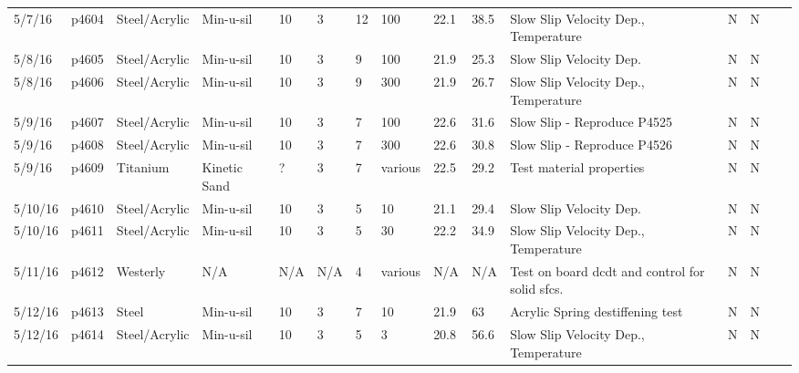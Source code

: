 \begin{landscape}
\begin{longtable}{lllllllllllllll}
5/7/16   & p4604      & Steel/Acrylic    & Min-u-sil    & 10           & 3         & 12            & 100                          & 22.1        & 38.5     & Slow Slip Velocity Dep., Temperature            & N     & N    &  &  \\
5/8/16   & p4605      & Steel/Acrylic    & Min-u-sil    & 10           & 3         & 9             & 100                          & 21.9        & 25.3     & Slow Slip Velocity Dep.                         & N     & N    &  &  \\
5/8/16   & p4606      & Steel/Acrylic    & Min-u-sil    & 10           & 3         & 9             & 300                          & 21.9        & 26.7     & Slow Slip Velocity Dep., Temperature            & N     & N    &  &  \\
5/9/16   & p4607      & Steel/Acrylic    & Min-u-sil    & 10           & 3         & 7             & 100                          & 22.6        & 31.6     & Slow Slip - Reproduce P4525                     & N     & N    &  &  \\
5/9/16   & p4608      & Steel/Acrylic    & Min-u-sil    & 10           & 3         & 7             & 300                          & 22.6        & 30.8     & Slow Slip - Reproduce P4526                     & N     & N    &  &  \\
5/9/16   & p4609      & Titanium         & Kinetic Sand & ?            & 3         & 7             & various                      & 22.5        & 29.2     & Test material properties                        & N     & N    &  &  \\
5/10/16  & p4610      & Steel/Acrylic    & Min-u-sil    & 10           & 3         & 5             & 10                           & 21.1        & 29.4     & Slow Slip Velocity Dep.                         & N     & N    &  &  \\
5/10/16  & p4611      & Steel/Acrylic    & Min-u-sil    & 10           & 3         & 5             & 30                           & 22.2        & 34.9     & Slow Slip Velocity Dep., Temperature            & N     & N    &  &  \\
5/11/16  & p4612      & Westerly         & N/A          & N/A          & N/A       & 4             & various                      & N/A         & N/A      & Test on board dcdt and control for solid sfcs.  & N     & N    &  &  \\
5/12/16  & p4613      & Steel            & Min-u-sil    & 10           & 3         & 7             & 10                           & 21.9        & 63       & Acrylic Spring destiffening test                & N     & N    &  &  \\
5/12/16  & p4614      & Steel/Acrylic    & Min-u-sil    & 10           & 3         & 5             & 3                            & 20.8        & 56.6     & Slow Slip Velocity Dep., Temperature            & N     & N    &  & 
\end{longtable}
\end{landscape}